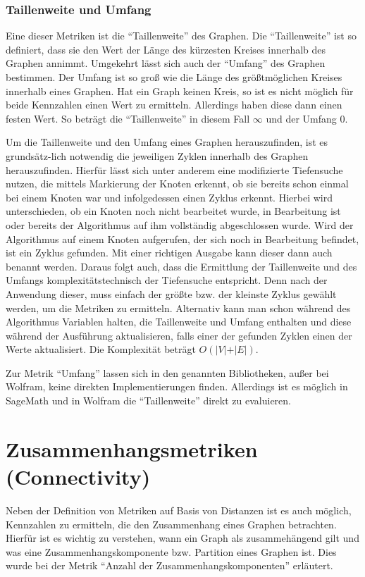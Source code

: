 \documentclass[a4paper,12pt,ngerman,chapterprefix=false,listof=totoc,bibliography=totoc]{scrreprt}
\begin{document}
\subsubsection*{Taillenweite und Umfang}
{
Eine dieser Metriken ist die "`Taillenweite"' des Graphen. Die "`Taillenweite"' ist so definiert, dass sie den Wert der Länge des kürzesten Kreises innerhalb des Graphen annimmt. Umgekehrt lässt sich auch der "`Umfang"' des Graphen bestimmen. Der Umfang ist so groß wie die Länge des größtmöglichen Kreises innerhalb eines Graphen. Hat ein Graph keinen Kreis, so ist es nicht möglich für beide Kennzahlen einen Wert zu ermitteln. Allerdings haben diese dann einen festen Wert. So beträgt die "`Taillenweite"' in diesem Fall \(\infty\) und der Umfang 0. \cite{diestel_graphentheorie_2000}

Um die Taillenweite und den Umfang eines Graphen herauszufinden, ist es grundsätz-lich notwendig die jeweiligen Zyklen innerhalb des Graphen herauszufinden. Hierfür lässt sich unter anderem eine modifizierte Tiefensuche nutzen, die mittels Markierung der Knoten erkennt, ob sie bereits schon einmal bei einem Knoten war und infolgedessen einen Zyklus erkennt. Hierbei wird unterschieden, ob ein Knoten noch nicht bearbeitet wurde, in Bearbeitung ist oder bereits der Algorithmus auf ihm vollständig abgeschlossen wurde. Wird der Algorithmus auf einem Knoten aufgerufen, der sich noch in Bearbeitung befindet, ist ein Zyklus gefunden. Mit einer richtigen Ausgabe kann dieser dann auch benannt werden. Daraus folgt auch, dass die Ermittlung der Taillenweite und des Umfangs komplexitätstechnisch der Tiefensuche entspricht. Denn nach der Anwendung dieser, muss einfach der größte bzw. der kleinste Zyklus gewählt werden, um die Metriken zu ermitteln. Alternativ kann man schon während des Algorithmus Variablen halten, die Taillenweite und Umfang enthalten und diese während der Ausführung aktualisieren, falls einer der gefunden Zyklen einen der Werte aktualisiert. Die Komplexität beträgt \(O(\vert V\vert +\vert E\vert)\). \cite{knebl_algorithmen_2019,vocking_taschenbuch_2008}

Zur Metrik "`Umfang"' lassen sich in den genannten Bibliotheken, außer bei Wolfram, keine direkten Implementierungen finden. Allerdings ist es möglich in SageMath und in Wolfram die "`Taillenweite"' direkt zu evaluieren. \cite{sagemath_graph_2020,wolfram_wolfram_2020}
}
\section{Zusammenhangsmetriken (Connectivity)}
{
Neben der Definition von Metriken auf Basis von Distanzen ist es auch möglich, Kennzahlen zu ermitteln, die den Zusammenhang eines Graphen betrachten. Hierfür ist es wichtig zu verstehen, wann ein Graph als zusammehängend gilt und was eine Zusammenhangskomponente bzw. Partition eines Graphen ist. Dies wurde bei der Metrik "`Anzahl der Zusammenhangskomponenten"' erläutert.
}
\end{document}
